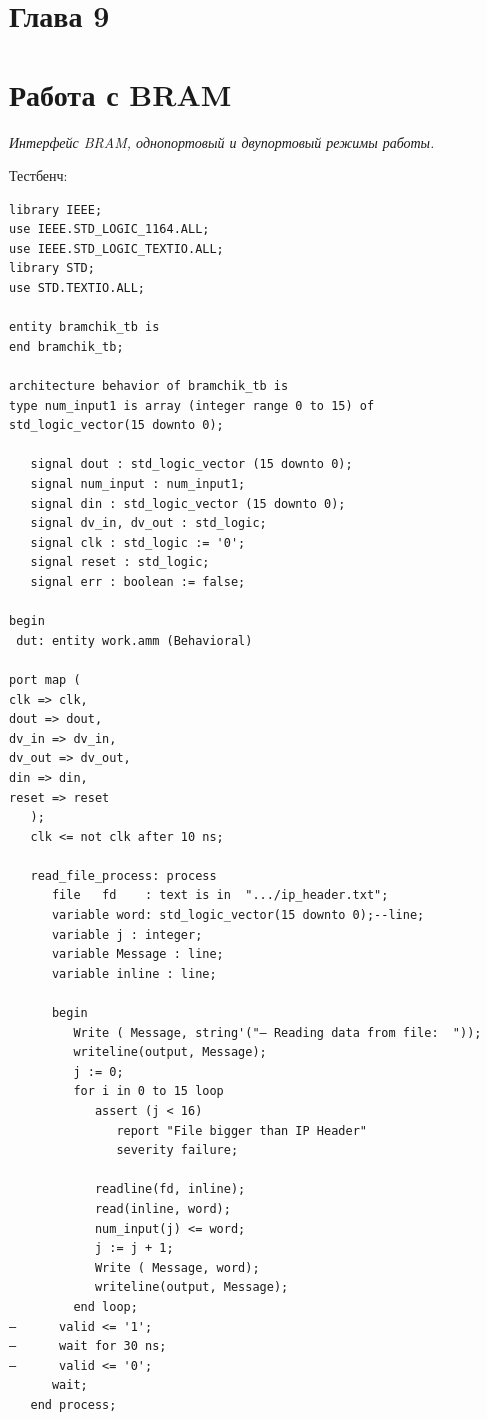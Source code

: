 \chapter{Глава 9}

\chapter{Работа с BRAM}

\emph{Интерфейс BRAM, однопортовый и двупортовый режимы работы.}

Тестбенч:

\begin{Code}
\begin{lstlisting}
library IEEE;
use IEEE.STD_LOGIC_1164.ALL;
use IEEE.STD_LOGIC_TEXTIO.ALL;
library STD;
use STD.TEXTIO.ALL;

entity bramchik_tb is
end bramchik_tb;

architecture behavior of bramchik_tb is
type num_input1 is array (integer range 0 to 15) of std_logic_vector(15 downto 0);
   
   signal dout : std_logic_vector (15 downto 0);  
   signal num_input : num_input1;
   signal din : std_logic_vector (15 downto 0); 
   signal dv_in, dv_out : std_logic;
   signal clk : std_logic := '0'; 
   signal reset : std_logic;
   signal err : boolean := false;
      
begin
 dut: entity work.amm (Behavioral)
 
port map (
clk => clk,
dout => dout,
dv_in => dv_in,
dv_out => dv_out,
din => din,
reset => reset
   );
   clk <= not clk after 10 ns; 

   read_file_process: process
      file   fd    : text is in  ".../ip_header.txt";
      variable word: std_logic_vector(15 downto 0);--line;
      variable j : integer;
      variable Message : line;
      variable inline : line;   
      
      begin
         Write ( Message, string'("— Reading data from file:  "));
         writeline(output, Message);
         j := 0;
         for i in 0 to 15 loop
            assert (j < 16)
               report "File bigger than IP Header"
               severity failure;

            readline(fd, inline);
            read(inline, word);
            num_input(j) <= word;
            j := j + 1;
            Write ( Message, word);
            writeline(output, Message);
         end loop;   
—      valid <= '1';
—      wait for 30 ns;
—      valid <= '0'; 
      wait;
   end process;


\end{lstlisting}
\end{Code}
